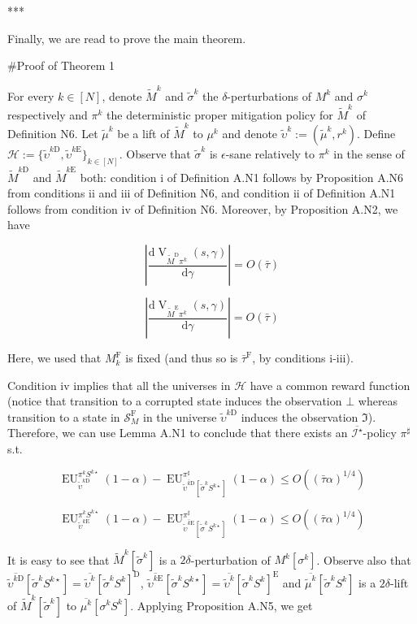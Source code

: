 \documentclass[a4paper]{article}
\newcommand{\AP}[1]{\left(#1\right)}
\newcommand{\AB}[1]{\left[#1\right]}
\newcommand{\D}{\mathrm{d}}
\newcommand{\Abs}[1]{\left\vert #1 \right\vert}
\newcommand{\St}{\mathcal{S}}
\newcommand{\In}{\mathcal{I}}
\newcommand{\Hy}{\mathcal{H}}
\newcommand{\RMD}{\mathrm{D}}
\newcommand{\RME}{\mathrm{E}}
\newcommand{\RMF}{\mathrm{F}}
\newcommand{\SF}{\St^{\RMF}}
\newcommand{\V}{\operatorname{V}}
\newcommand{\EU}{\operatorname{EU}}
\begin{document}
***

Finally, we are read to prove the main theorem.

\#Proof of Theorem 1

For every $k \in [N]$, denote $\tilde{M}^k$ and $\tilde{\sigma}^k$ the $\delta$-perturbations of $M^k$ and $\sigma^k$ respectively and $\pi^k$ the deterministic proper mitigation policy for $\tilde{M}^k$ of Definition N6. Let $\tilde{\mu}^k$ be a lift of $\tilde{M}^k$ to $\mu^k$ and denote $\tilde{\upsilon}^k:=(\tilde{\mu}^k,r^k)$. Define $\Hy:=\{\tilde{\upsilon}^{k\RMD},\tilde{\upsilon}^{k\RME}\}_{k \in [N]}$. Observe that $\tilde{\sigma}^{k}$ is $\epsilon$-sane relatively to $\pi^k$ in the sense of $\tilde{M}^{k\RMD}$ and $\tilde{M}^{k\RME}$ both: condition i of Definition A.N1 follows by Proposition A.N6 from conditions ii and iii of Definition N6, and condition ii of Definition A.N1 follows from condition iv of Definition N6. Moreover, by Proposition A.N2, we have

$$\Abs{\frac{\D\V_{\tilde{M}^\RMD\pi^k}(s,\gamma)}{\D\gamma}} = O\AP{\bar{\tau}}$$

$$\Abs{\frac{\D\V_{\tilde{M}^\RME\pi^k}(s,\gamma)}{\D\gamma}} = O\AP{\bar{\tau}}$$

Here, we used that $M^\RMF_k$ is fixed (and thus so is $\bar{\tau}^\RMF$, by conditions i-iii).

Condition iv implies that all the universes in $\Hy$ have a common reward function (notice that transition to a corrupted state induces the observation $\bot$ whereas transition to a state in $\SF_M$ in the universe $\tilde{\upsilon}^{k\RMD}$ induces the observation $\Im$). Therefore, we can use Lemma A.N1 to conclude that there exists an $\overline{\In^\star}$-policy $\pi^\sharp$ s.t.

$$\EU_{\tilde{\upsilon}^{k\RMD}}^{\pi^kS^{k\star}}(1-\alpha) - \EU_{\overline{\tilde{\upsilon}^{k\RMD}}\AB{\tilde{\sigma}^k S^{k\star}}}^{\pi^\sharp}(1-\alpha) \leq O\AP{(\bar{\tau} \alpha)^{1/4}}$$

$$\EU_{\tilde{\upsilon}^{k\RME}}^{\pi^kS^{k\star}}(1-\alpha) - \EU_{\overline{\tilde{\upsilon}^{k\RME}}\AB{\tilde{\sigma}^k S^{k\star}}}^{\pi^\sharp}(1-\alpha) \leq O\AP{(\bar{\tau} \alpha)^{1/4}}$$

It is easy to see that $\tilde{M}^k\AB{\tilde{\sigma}^k}$ is a $2\delta$-perturbation of $M^k\AB{\sigma^k}$. Observe also that $\overline{\tilde{\upsilon}^{k\RMD}}\AB{\tilde{\sigma}^k S^{k\star}} = \overline{\tilde{\upsilon}^{k}}\AB{\tilde{\sigma}^k S^{k}}^\RMD$, $\overline{\tilde{\upsilon}^{k\RME}}\AB{\tilde{\sigma}^k S^{k\star}} = \overline{\tilde{\upsilon}^{k}}\AB{\tilde{\sigma}^k S^{k}}^\RME$ and $\overline{\tilde{\mu}^{k}}\AB{\tilde{\sigma}^k S^{k}}$ is a $2\delta$-lift of $\tilde{M}^k\AB{\tilde{\sigma}^k}$ to $\overline{\mu^k}\AB{\sigma^k S^k}$. Applying Proposition A.N5, we get
\end{document}
